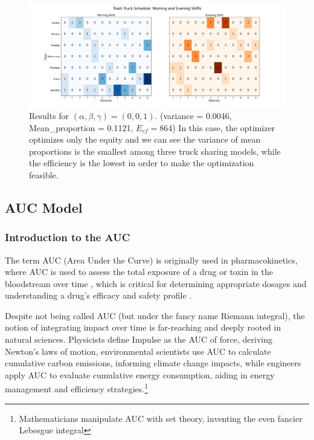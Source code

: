 \documentclass{article}
\begin{document}
\begin{figure}[H]
	\centering
	\includegraphics[width=1\textwidth]{figures/figures_shared/PGC sharing.jpg}
	\caption{Results for $(\alpha, \beta,\gamma) = (0,0,1)$. (variance = 0.0046, Mean\_proportion = 0.1121, $E_{ef}$$ =  864$) In this case, the optimizer optimizes only the equity and we can see the variance of mean proportions is the smallest among three truck sharing models, while the efficiency is the lowest in order to make the optimization feasible.}
\end{figure}


\subsection{AUC Model}

\subsubsection{Introduction to the AUC}
\label{sec:auc}

The term AUC (Area Under the Curve) is originally used in pharmacokinetics, where AUC is used to assess the total exposure of a drug or toxin in the bloodstream over time \cite{scheff2011assessment}, which is critical for determining appropriate dosages and understanding a drug’s efficacy and safety profile \cite{turner2020area}. 

Despite not being called AUC (but under the fancy name Riemann integral), the notion of integrating impact over time is far-reaching and deeply rooted in natural sciences. Physicists define Impulse as the AUC of force, deriving Newton's laws of motion, environmental scientists use AUC to calculate cumulative carbon emissions, informing climate change impacts, while engineers apply AUC to evaluate cumulative energy consumption, aiding in energy management and efficiency strategies.\footnote{Mathematicians manipulate AUC with set theory, inventing the even fancier Lebesgue integral}
\end{document}
